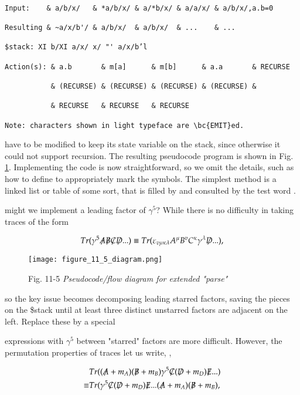 \begin{verbatim}

Input:    & a/b/x/   & *a/b/x/ & a/*b/x/ & a/a/x/ & a/b/x/,a.b=0

Resulting & ~a/x/b'/ & a/b/x/  & a/b/x/  & ...    & ...

$stack: XI b/XI a/x/ x/ "' a/x/b’l

Action(s): & a.b       & m[a]      & m[b]      & a.a       & RECURSE

           & (RECURSE) & (RECURSE) & (RECURSE) & (RECURSE) &

           & RECURSE   & RECURSE   & RECURSE

Note: characters shown in light typeface are \bc{EMIT}ed.
\end{verbatim}

have to be modified to keep its state variable on the stack, since otherwise it could not support recursion. The resulting pseudocode program is shown in Fig. \ref{fig:11_05}. Implementing the code is now straightforward, so we omit the details, such as how to define  to appropriately mark the symbols. The simplest method is a linked list or table of some sort, that is filled by  and consulted by the test word .


 might we implement a leading factor of $\gamma^{5}$? While there is no difficulty in taking traces of the form

\begin{equation}
Tr( \gamma^{5} \tr{A} \tr{B} \tr{C} \tr{D} ...) \equiv Tr(\varepsilon_{v\mu\kappa\lambda} A^{\mu} B^{v} C^{\kappa} \gamma^{\lambda} \tr{D} ...),
\end{equation}

\begin{figure}
    \texttt{[image: figure\_11\_5\_diagram.png]}
    \caption{Fig. 11-5 \textit{Pseudocode/flow diagram for extended "parse"}}
    \label{fig:11_05}
\end{figure}

so the key issue becomes decomposing leading starred factors, saving the pieces on the \$stack until at least three distinct unstarred factors are adjacent on the left. Replace these by a special 

expressions with $\gamma^{5}$ between "starred" factors are more difficult. However, the permutation properties of traces let us write, \eg,

\begin{align}
& Tr( (\tr{A} + m_{A})(\tr{B} + m_{B})\gamma^{5} \tr{C}(\tr{D} + m_{D})\tr{E} ... ) \\
\equiv & Tr(\gamma^{5}\tr{C}(\tr{D} + m_{D})\tr{E} ... (\tr{A} + m_{A})(\tr{B} + m_{B}) ,
\end{align}

